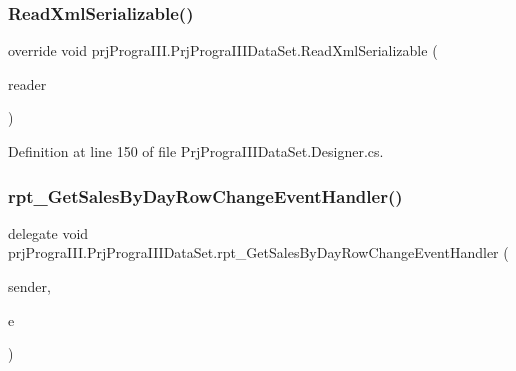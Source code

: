 \subsubsection{\texorpdfstring{Read\+Xml\+Serializable()}{ReadXmlSerializable()}}
{\footnotesize\ttfamily override void prj\+Progra\+I\+I\+I.\+Prj\+Progra\+I\+I\+I\+Data\+Set.\+Read\+Xml\+Serializable (\begin{DoxyParamCaption}\item[{global\+::\+System.\+Xml.\+Xml\+Reader}]{reader }\end{DoxyParamCaption})\hspace{0.3cm}{\ttfamily [protected]}}



Definition at line 150 of file Prj\+Progra\+I\+I\+I\+Data\+Set.\+Designer.\+cs.

\hypertarget{classprj_progra_i_i_i_1_1_prj_progra_i_i_i_data_set_aa1d46bd3c23f7f4fb63afc2bdb363a5b}{}\label{classprj_progra_i_i_i_1_1_prj_progra_i_i_i_data_set_aa1d46bd3c23f7f4fb63afc2bdb363a5b} 
\subsubsection{\texorpdfstring{rpt\+\_\+\+Get\+Sales\+By\+Day\+Row\+Change\+Event\+Handler()}{rpt\_GetSalesByDayRowChangeEventHandler()}}
{\footnotesize\ttfamily delegate void prj\+Progra\+I\+I\+I.\+Prj\+Progra\+I\+I\+I\+Data\+Set.\+rpt\+\_\+\+Get\+Sales\+By\+Day\+Row\+Change\+Event\+Handler (\begin{DoxyParamCaption}\item[{object}]{sender,  }\item[{\hyperlink{classprj_progra_i_i_i_1_1_prj_progra_i_i_i_data_set_1_1rpt___get_sales_by_day_row_change_event}{rpt\+\_\+\+Get\+Sales\+By\+Day\+Row\+Change\+Event}}]{e }\end{DoxyParamCaption})}

